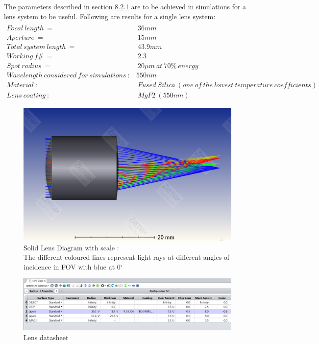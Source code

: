 \documentclass[../../main.tex]{subfiles}
\begin{document}
The parameters described in section \hyperref[sec:imagespec]{8.2.1} are to be achieved in simulations for a lens system to be useful.
\newpage
Following are results for a single lens system:
\begin{align*}
    \\Focal\:length\:=&\:36mm
    \\Aperture\:=&\:15mm
    \\Total\:system\:length\:=&\:43.9mm
    \\Working\:f\#\:=&\:2.3
    \\Spot\:radius\:=&\:20\mu m\:at\:70\%\:energy 
    \\Wavelength\:considered\:for\:simulations\::&550nm
    \\Material\::&\:Fused\:Silica\:(one\:of\:the\:lowest\:temperature\:coefficients)
    \\Lens\:coating\::&\:MgF2\:(550nm)
\end{align*}
\begin{figure}[h!]
    \centering
    \includegraphics[width=0.5\linewidth]{Figures/Instrumentation/single_lens_3d_1.PNG}
    \caption{Solid Lens Diagram with scale :\\The different coloured lines represent light rays at different angles of incidence in FOV with blue at 0$^{\circ}$}
    \label{fig:single_lens_3d_1}
\end{figure}
\begin{figure}[h!]
    \centering
    \includegraphics[width=\linewidth]{Figures/Instrumentation/single_lens_datasheet_1.PNG}
    \caption{Lens datasheet}
    \label{fig:single_lens_datasheet_1}
\end{figure}
\pagebreak[4]
\end{document}
